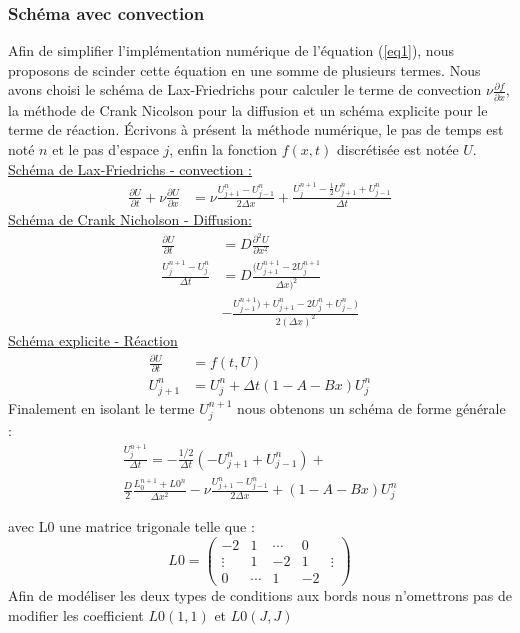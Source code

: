 \documentclass[fleqn,10pt]{SelfArx}
\begin{document}
\subsubsection*{Schéma avec convection}
Afin de simplifier l'implémentation numérique de l'équation (\ref{eq1}), nous proposons de scinder cette équation en une somme de plusieurs termes. Nous avons choisi le schéma de Lax-Friedrichs pour calculer le terme de convection $\nu \frac{\partial f}{\partial x}$, la méthode de Crank Nicolson pour la diffusion et un schéma explicite pour le terme de réaction. Écrivons à présent la méthode numérique, le pas de temps est noté $n$ et le pas d'espace $j$, enfin la fonction $f(x,t)$ discrétisée est notée $U$. \\
\underline{Schéma de Lax-Friedrichs - convection :}
\begin{align*}
\frac{\partial U}{\partial t}+\nu \frac{\partial U}{\partial x} &= \nu \frac{U_{j+1} ^n - U_{j-1}^n}{2\Delta x}  + \frac{ U_j^{n+1} - \frac{1}{2}U_{j+1}^n + U_{j-1}^n}{\Delta t}
\end{align*}
\underline{Schéma de Crank Nicholson - Diffusion:}
\begin{align*}
\frac{\partial U}{\partial t} &= D\frac{\partial^2U}{\partial x^2}\\
\frac{U_j^{n+1} - U_j^n}{\Delta t} &=D\frac{(U_{j+1}^{n+1} -2U_{j}^{n+1} }{\Delta x)^2}\\
&- \frac{U_{j-1}^{n+1}) + U_{j+1}^{n} -2U_{j}^{n} + U_{j-}^{n})}{2(\Delta x)^2}
\end{align*}
\underline{Schéma explicite - Réaction}
\begin{align*}
 \frac{\partial U}{\partial t} &= f(t, U) \\
 U_{j+1}^n &= U_{j}^n + \Delta t (1-A-Bx) U_j^n
\end{align*}
Finalement en isolant le terme $U_j^{n+1}$ nous obtenons un schéma de forme générale :
\begin{align*}
\frac{U_j^{n+1}}{\Delta t} = - \frac{1/2}{\Delta t}(-U_{j+1}^n +U_{j-1}^n )+ \\ 
\frac{D}{2}\frac{L_0^{n+1}+L0^n}{\Delta x^2}- \nu \frac{U_{j+1} ^n - U_{j-1}^n}{2\Delta x} +(1-A-Bx) U_j^n
\end{align*}

avec L0 une matrice trigonale telle que : 
$$
L0 = \begin{pmatrix}
    -2 & 1    & \cdots & 0 \\ 
    \vdots & 1 & -2 & 1 & \vdots \\ 
    0      & \cdots & 1 & -2
\end{pmatrix}
$$
Afin de modéliser les deux types de conditions aux bords nous n'omettrons pas de modifier les coefficient $L0(1,1)$ et $L0(J,J)$
\newline
\end{document}
